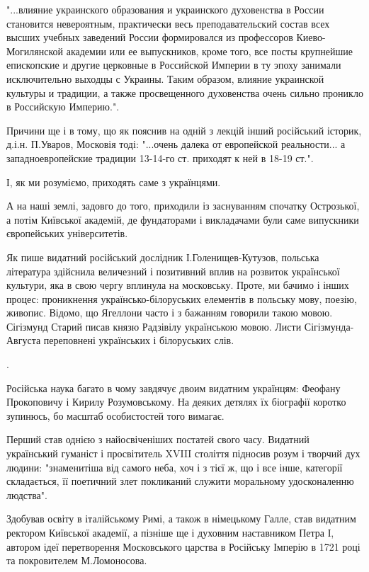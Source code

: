 "...влияние украинского образования и украинского духовенства в России
становится невероятным, практически весь преподавательский состав всех высших
учебных заведений России формировался из профессоров Киево-Могилянской академии
или ее выпускников, кроме того, все посты крупнейшие епископские и другие
церковные в Российской Империи в ту эпоху занимали исключительно выходцы с
Украины. Таким образом, влияние украинской культуры и традиции, а также
просвещенного духовенства очень сильно проникло в Российскую Империю.". 

Причини ще і в тому, що як пояснив на одній з лекцій інший російський історик,
д.і.н. П.Уваров, Московія тоді: "...очень далека от европейской реальности... а
западноевропейские традиции 13-14-го ст. приходят к ней в 18-19 ст.". 

І, як ми розуміємо, приходять саме з українцями. 

А на наші землі, задовго до того, приходили із заснуванням спочатку Острозької,
а потім Київської академій, де фундаторами і викладачами були саме випускники
європейських університетів.

Як пише видатний російський дослідник І.Голенищев-Кутузов, польська література
здійснила величезний і позитивний вплив на розвиток української культури, яка в
свою чергу вплинула на московську. Проте, ми бачимо і інших процес: проникнення
українсько-білоруських елементів в польську мову, поезію, живопис. Відомо, що
Ягеллони часто і з бажанням говорили такою мовою. Сігізмунд Старий писав князю
Радзівілу українською мовою. Листи Сігізмунда-Августа переповнені українських і
білоруських слів.

.

Російська наука багато в чому завдячує двоим видатним українцям: Феофану
Прокоповичу і Кирилу Розумовському. На деяких детялях їх біографії коротко
зупинюсь, бо масштаб особистостей того вимагає.

Перший став однією з найосвіченіших постатей свого часу. Видатний український
гуманіст і просвітитель XVIII століття підносив розум і творчий дух людини:
"знаменитіша від самого неба, хоч і з тієї ж, що і все інше, категорії
складається, її поетичний злет покликаний служити моральному удосконаленню
людства". 

Здобував освіту в італійському Римі, а також в німецькому Галле, став видатним
ректором Київської академії, а пізніше ще і духовним наставником Петра І,
автором ідеї перетворення Московського царства в Російську Імперію в 1721 році
та покровителем М.Ломоносова. 

